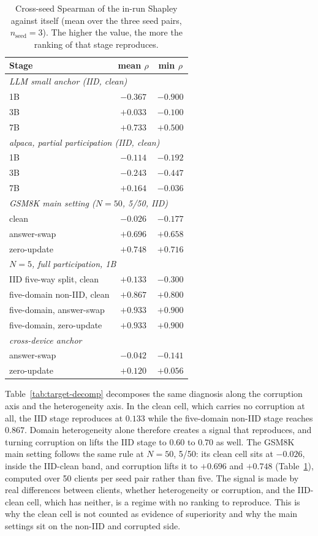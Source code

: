 \documentclass[letterpaper]{article} %
\theoremstyle{plain}
\begin{document}
\begin{table}[t]
\centering
\small
\setlength{\tabcolsep}{4pt}
\caption{Cross-seed Spearman of the in-run Shapley against itself (mean over
the three seed pairs, $n_{\mathrm{seed}}{=}3$). The higher the value, the
more the ranking of that stage reproduces.}
\label{tab:target-stability}
\begin{tabular}{lcc}
\hline
Stage & mean $\rho$ & min $\rho$ \\
\hline
\multicolumn{3}{l}{\emph{LLM small anchor (IID, clean)}} \\
1B & $-0.367$ & $-0.900$ \\
3B & $+0.033$ & $-0.100$ \\
7B & $+0.733$ & $+0.500$ \\
\hline
\multicolumn{3}{l}{\emph{alpaca, partial participation (IID, clean)}} \\
1B & $-0.114$ & $-0.192$ \\
3B & $-0.243$ & $-0.447$ \\
7B & $+0.164$ & $-0.036$ \\
\hline
\multicolumn{3}{l}{\emph{GSM8K main setting ($N{=}50$, 5/50, IID)}} \\
clean & $-0.026$ & $-0.177$ \\
answer-swap & $+0.696$ & $+0.658$ \\
zero-update & $+0.748$ & $+0.716$ \\
\hline
\multicolumn{3}{l}{\emph{$N{=}5$, full participation, 1B}} \\
IID five-way split, clean & $+0.133$ & $-0.300$ \\
five-domain non-IID, clean & $+0.867$ & $+0.800$ \\
five-domain, answer-swap & $+0.933$ & $+0.900$ \\
five-domain, zero-update & $+0.933$ & $+0.900$ \\
\hline
\multicolumn{3}{l}{\emph{cross-device anchor}} \\
answer-swap & $-0.042$ & $-0.141$ \\
zero-update & $+0.120$ & $+0.056$ \\
\hline
\end{tabular}
\end{table}

Table~\ref{tab:target-decomp} decomposes the same diagnosis along the
corruption axis and the heterogeneity axis. In the clean cell, which carries
no corruption at all, the IID stage reproduces at $0.133$ while the
five-domain non-IID stage reaches $0.867$. Domain heterogeneity alone
therefore creates a signal that reproduces, and turning corruption on lifts
the IID stage to $0.60$ to $0.70$ as well. The GSM8K main setting follows
the same rule at $N{=}50$, 5/50: its clean cell sits at $-0.026$, inside the
IID-clean band, and corruption lifts it to $+0.696$ and $+0.748$
(Table~\ref{tab:target-stability}), computed over 50 clients per seed pair
rather than five. The signal is made by real
differences between clients, whether heterogeneity or corruption, and the
IID-clean cell, which has neither, is a regime with no ranking to reproduce.
This is why the clean cell is not counted as evidence of superiority and why
the main settings sit on the non-IID and corrupted side.
\end{document}
